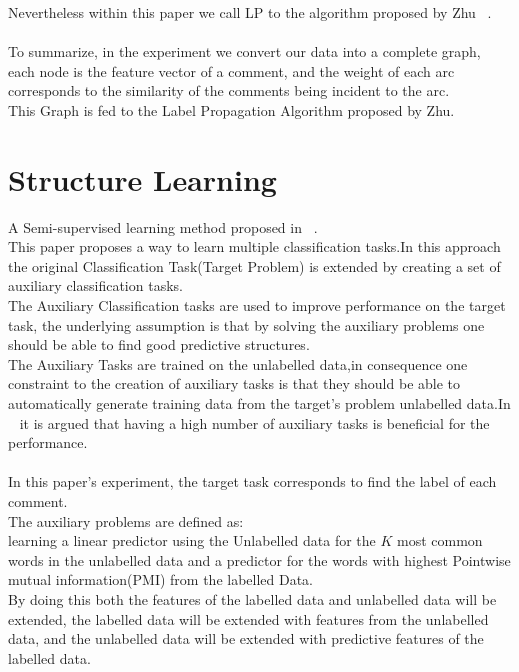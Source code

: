 \documentclass[4pt,a4paper,twocolumn]{article}
\begin{document}
Nevertheless within this paper we call LP to the algorithm proposed by Zhu ~\cite{Zhu:2005:SLG:1104523}.\\
\\
To summarize, in the experiment we convert our data into a complete graph,
each node is the feature vector of a comment, and the weight of each arc
corresponds to the similarity of the comments being incident to the arc.\\
This Graph is  fed to the Label Propagation Algorithm proposed by Zhu.\\



 
\section{Structure Learning}
A Semi-supervised learning method proposed in ~\cite{Ando:2005:FLP:1046920.1194905}.\\
This paper proposes a way to learn multiple classification tasks.In this approach the original Classification Task(Target Problem) is extended by creating a set of auxiliary classification tasks.\\
The Auxiliary Classification tasks are used to improve performance on the target task,
the underlying assumption is that by solving the auxiliary problems one should be able to find good predictive structures.\\
The Auxiliary Tasks are trained on the unlabelled data,in consequence one constraint to the creation of auxiliary tasks is that they should be able to automatically generate training data from the target's problem unlabelled data.In ~\cite{Ando:2005:HSL:1219840.1219841} it is argued that having a high number of auxiliary tasks is beneficial for the performance.\\
\\
In this paper's experiment, the target task corresponds to find the label of each comment.\\
The auxiliary problems are defined as:\\
learning a linear predictor using the Unlabelled data for the $K$ most common words in the unlabelled data and a predictor for the words with highest Pointwise mutual information(PMI) from the labelled Data.\\
By doing this both the features of the labelled data and unlabelled data will be extended, the labelled data will be extended with features from the unlabelled data, and the unlabelled data will be extended with predictive features of the labelled data.\\
\end{document}
